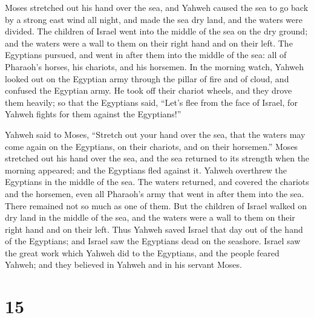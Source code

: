  Moses stretched out his hand over the sea, and Yahweh
caused the sea to go back by a strong east wind all night, and made the
sea dry land, and the waters were divided.  The children
of Israel went into the middle of the sea on the dry ground; and the
waters were a wall to them on their right hand and on their left.
 The Egyptians pursued, and went in after them into the
middle of the sea: all of Pharaoh's horses, his chariots, and his
horsemen.  In the morning watch, Yahweh looked out on the
Egyptian army through the pillar of fire and of cloud, and confused the
Egyptian army.  He took off their chariot wheels, and
they drove them heavily; so that the Egyptians said, ``Let's flee from
the face of Israel, for Yahweh fights for them against the Egyptians!''

 Yahweh said to Moses, ``Stretch out your hand over the
sea, that the waters may come again on the Egyptians, on their chariots,
and on their horsemen.''  Moses stretched out his hand
over the sea, and the sea returned to its strength when the morning
appeared; and the Egyptians fled against it. Yahweh overthrew the
Egyptians in the middle of the sea.  The waters returned,
and covered the chariots and the horsemen, even all Pharaoh's army that
went in after them into the sea. There remained not so much as one of
them.  But the children of Israel walked on dry land in
the middle of the sea, and the waters were a wall to them on their right
hand and on their left.  Thus Yahweh saved Israel that
day out of the hand of the Egyptians; and Israel saw the Egyptians dead
on the seashore.  Israel saw the great work which Yahweh
did to the Egyptians, and the people feared Yahweh; and they believed in
Yahweh and in his servant Moses.

\hypertarget{section-14}{%
\section{15}\label{section-14}}

